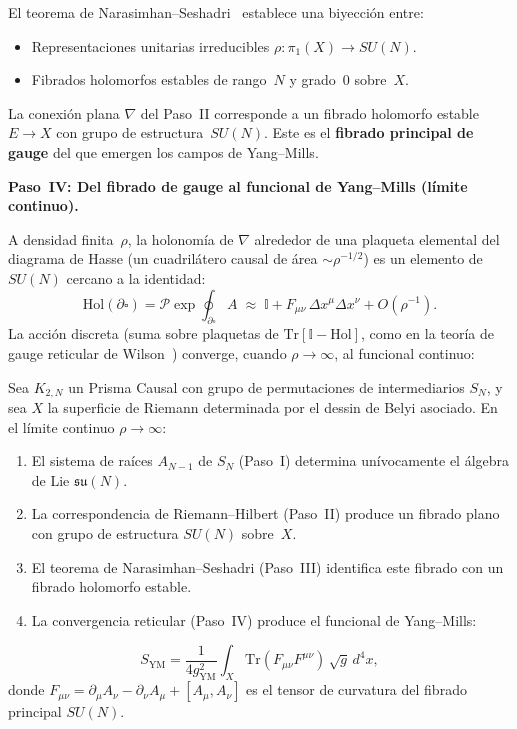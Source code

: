 \documentclass[11pt, a4paper, openany]{book}
\begin{document}
El teorema de Narasimhan--Seshadri~\cite{narasimhan1965} establece
una biyecci\'on entre:
\begin{itemize}
  \item Representaciones unitarias irreducibles
    $\rho \colon \pi_1(X) \to SU(N)$.
  \item Fibrados holomorfos estables de rango~$N$ y grado~0
    sobre~$X$.
\end{itemize}
La conexi\'on plana $\nabla$ del Paso~II corresponde a un fibrado
holomorfo estable $E \to X$ con grupo de estructura~$SU(N)$. Este
es el \textbf{fibrado principal de gauge} del que emergen los campos
de Yang--Mills.

\medskip\noindent
\textbf{Paso~IV: Del fibrado de gauge al funcional de Yang--Mills
(l\'imite continuo).}

A densidad finita~$\rho$, la holonom\'ia de $\nabla$ alrededor de una
plaqueta elemental del diagrama de Hasse (un cuadril\'atero causal de
\'area $\sim \rho^{-1/2}$) es un elemento de $SU(N)$ cercano a la
identidad:
\[
  \mathrm{Hol}(\partial \square) = \mathcal{P}\exp\!\oint_{\partial \square}
  A \;\approx\; \mathbb{I} + F_{\mu\nu}\,\Delta x^\mu \Delta x^\nu
  + O(\rho^{-1}).
\]
La acci\'on discreta (suma sobre plaquetas de
$\mathrm{Tr}[\mathbb{I} - \mathrm{Hol}]$, como en la teor\'ia de
gauge reticular de Wilson~\cite{wilson1974}) converge, cuando
$\rho \to \infty$, al funcional continuo:

\begin{theorem}
\label{thm:yang-mills-continuum}
Sea $K_{2,N}$ un Prisma Causal con grupo de permutaciones de
intermediarios $S_N$, y sea $X$ la superficie de Riemann determinada
por el dessin de Belyi asociado. En el l\'imite continuo
$\rho \to \infty$:
\begin{enumerate}
  \item El sistema de ra\'ices $A_{N-1}$ de $S_N$ (Paso~I) determina
    un\'ivocamente el \'algebra de Lie $\mathfrak{su}(N)$.
  \item La correspondencia de Riemann--Hilbert (Paso~II) produce un
    fibrado plano con grupo de estructura $SU(N)$ sobre~$X$.
  \item El teorema de Narasimhan--Seshadri (Paso~III) identifica este
    fibrado con un fibrado holomorfo estable.
  \item La convergencia reticular (Paso~IV) produce el funcional de
    Yang--Mills:
\end{enumerate}
\begin{equation}
  S_{\mathrm{YM}} = \frac{1}{4g_{\mathrm{YM}}^2}
  \int_X \mathrm{Tr}(F_{\mu\nu} F^{\mu\nu})\,\sqrt{g}\,d^4x,
  \label{eq:yang-mills-action}
\end{equation}
donde $F_{\mu\nu} = \partial_\mu A_\nu - \partial_\nu A_\mu
+ [A_\mu, A_\nu]$ es el tensor de curvatura del fibrado principal
$SU(N)$.
\end{theorem}
\end{document}
